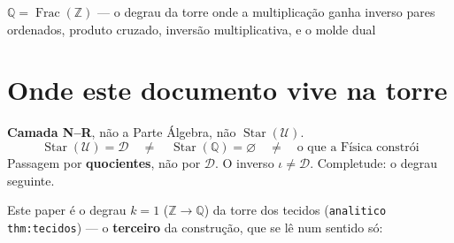 \documentclass[11pt,a4paper]{article}
\newcommand{\code}[1]{\texttt{\small #1}}
\begin{document}
       {$\mathbb{Q}=\operatorname{Frac}(\mathbb{Z})$ --- o degrau da torre
        onde a multiplicação ganha inverso}
       {pares ordenados, produto cruzado, inversão multiplicativa, e o molde dual}
\maketitle

\begin{abstract}
O \emph{Corpo Algébrico} constrói $\mathbb{R}$ a partir de
$\mathbb{Q}(m\sqrt D)$, com o espaço dual, as quatro propriedades
(P1,P2,D1,D2), a operação $\star$, e Dir/Cruz como projectores do espelho
$\tau$. Este paper faz o degrau \textbf{seguinte} ao \code{inteiros.tex} na
construção (bit $\to\mathbb{N}\to\mathbb{Z}\to\mathbb{Q}\to\mathbb{R}$), com o
\textbf{mesmo molde} da torre dos tecidos (\code{analitico thm:tecidos}):
\[
\mathbb{Z} \;\longrightarrow\;
\operatorname{Frac}(\mathbb{Z})=\mathbb{Q}.
\]
O espaço base é $\mathbb{Z}^{2}$, o racional é a \textbf{classe de
equivalência} de pares ordenados de inteiros $(a,b)$ com $b\neq 0$, sob a
relação $(a,b)\sim(c,d)\iff ad=bc$. A involução é o swap
$\iota(a,b)=(b,a)$, e as duas leituras --- Dir e Cruz --- surgem da
decomposição simétrica/antissimétrica da forma bilinear escolhida
$B((a,b),(c,d))=ad$ e da sua transposta $B^{\tau}=bc$.
O novo mecanismo estrutural deste degrau é a representação por pares:
$\iota(a,b)=(b,a)$ é uma operação sobre representantes que induz a inversão
multiplicativa $[(a,b)]^{-1}=[(b,a)]$ sobre classes.
\end{abstract}

\section*{Onde este documento vive na torre}

\noindent\textbf{Camada N--R}, não a Parte Álgebra, não \(\operatorname{Star}(\mathcal{U})\).
\[
\boxed{\;
\operatorname{Star}(\mathcal{U})=\mathcal{D}
\quad\neq\quad
\operatorname{Star}(\mathbb{Q})=\varnothing
\quad\neq\quad
\text{o que a Física constrói}
\;}
\]
Passagem por \textbf{quocientes}, não por \(\mathcal{D}\). O inverso \(\iota\neq\mathcal{D}\). Completude: o degrau seguinte.

Este paper é o degrau $k=1$ ($\mathbb{Z}\to\mathbb{Q}$) da torre dos tecidos
(\code{analitico thm:tecidos}) --- o \textbf{terceiro} da construção, que se lê
num sentido só:
\end{document}
